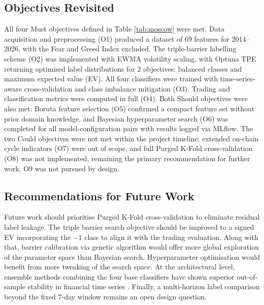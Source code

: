 \subsection{Objectives Revisited}
All four Must objectives defined in Table \ref{tab:moscow} were met. Data acquisition and preprocessing (O1) produced a dataset of 69 features for 2014–2026, with the Fear and Greed Index excluded. The triple-barrier labelling scheme (O2) was implemented with EWMA volatility scaling, with Optuna TPE returning optimised label distributions for 2 objectives: balanced classes and maximum expected value (EV). All four classifiers were trained with time-series-aware cross-validation and class imbalance mitigation (O3). Trading and classification metrics were computed in full (O4). Both Should objectives were also met: Boruta feature selection (O5) confirmed a compact feature set without prior domain knowledge, and Bayesian hyperparameter search (O6) was completed for all model-configuration pairs with results logged via MLflow. The two Could objectives were not met within the project timeline: extended on-chain cycle indicators (O7) were out of scope, and full Purged K-Fold cross-validation (O8) was not implemented, remaining the primary recommendation for further work. O9 was not pursued by design.

\subsection{Recommendations for Future Work}
Future work should prioritise Purged K-Fold cross-validation to eliminate residual label leakage. The triple barrier search objective should be improved to a signed EV incorporating the $-1$ class to align it with the trading evaluation. Along with that, barrier calibration via genetic algorithm would offer more global exploration of the parameter space than Bayesian search. Hyperparameter optimisation would benefit from more tweaking of the search space. At the architectural level, ensemble methods combining the four base classifiers have shown superior out-of-sample stability in financial time series \cite{tanrikuluEffectDataTypes2025}. Finally, a multi-horizon label comparison beyond the fixed 7-day window remains an open design question.